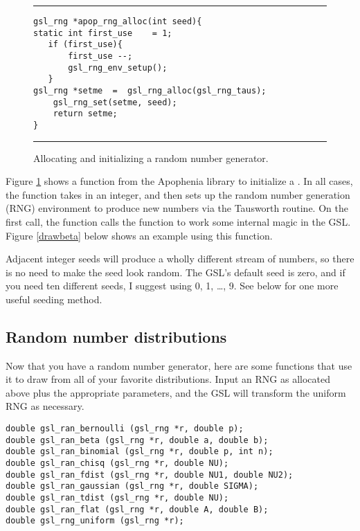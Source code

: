 \begin{figure}
	\hrule\vskip4pt
\begin{lstlisting}[frame=none]
gsl_rng *apop_rng_alloc(int seed){
static int first_use    = 1;
   if (first_use){
       first_use --;
       gsl_rng_env_setup();
   }
gsl_rng *setme  =  gsl_rng_alloc(gsl_rng_taus);
    gsl_rng_set(setme, seed);
    return setme;
}
\end{lstlisting}
	\hrule
\caption{Allocating and initializing a random number generator.}
\label{rng_alloc}
\end{figure}

Figure \ref{rng_alloc} shows a function from the Apophenia library to initialize a .
In all cases, the function takes in an integer, and then sets up the
random number generation (RNG) environment to produce new numbers
via the Tausworth routine.  On the first call, the function calls the
 function to work some internal magic in
the GSL. Figure \ref{drawbeta} below shows an example using this
function.

Adjacent integer seeds will produce a wholly different stream of numbers,
so there is no need to make the seed look random. The GSL's default seed is
zero, and if you need ten different seeds, I suggest using 0, 1, \dots, 9.
See below for one more useful seeding method.

\subsection{Random number distributions}
Now that you have a random number generator, here are some functions that use it to draw from all of your favorite distributions. Input an RNG as allocated above plus the appropriate parameters, and the GSL will transform the uniform RNG as necessary.
    
  
 

\begin{lstlisting}
double gsl_ran_bernoulli (gsl_rng *r, double p);
double gsl_ran_beta (gsl_rng *r, double a, double b);
double gsl_ran_binomial (gsl_rng *r, double p, int n);
double gsl_ran_chisq (gsl_rng *r, double NU);
double gsl_ran_fdist (gsl_rng *r, double NU1, double NU2);
double gsl_ran_gaussian (gsl_rng *r, double SIGMA);
double gsl_ran_tdist (gsl_rng *r, double NU);
double gsl_ran_flat (gsl_rng *r, double A, double B);
double gsl_rng_uniform (gsl_rng *r);
\end{lstlisting}

